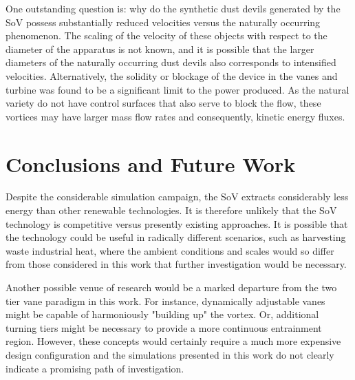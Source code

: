 



One outstanding question is: why do the synthetic dust devils generated by
the SoV possess substantially reduced velocities versus the naturally
occurring phenomenon. The scaling of the velocity of these objects with
respect to the diameter of the apparatus is not known, and it is
possible that the larger diameters of the naturally occurring dust
devils also corresponds to intensified velocities. Alternatively,
the solidity or blockage of the device in the vanes and turbine was
found to be a significant limit to the power produced. As the natural
variety do not have control surfaces that also serve to block the flow,
these vortices may have larger mass flow rates and consequently, 
kinetic energy fluxes.  
 
\section{Conclusions and Future Work}

Despite the considerable simulation campaign, the SoV extracts
considerably less energy than other renewable technologies. It is
therefore unlikely that the SoV technology is competitive versus
presently existing approaches. It is possible that the technology could
be useful in radically different scenarios, such as harvesting waste
industrial heat, where the ambient conditions and scales would so differ
from those considered in this work that further investigation would be
necessary.  

Another possible venue of research would be a marked departure from the
two tier vane paradigm in this work. For instance, dynamically
adjustable vanes might be capable of harmoniously "building up" the
vortex. Or, additional turning tiers might be necessary to provide a
more continuous entrainment region.
However, these concepts would certainly require a much more expensive
design configuration and the simulations presented in this work do not
clearly indicate a promising path of investigation. 

